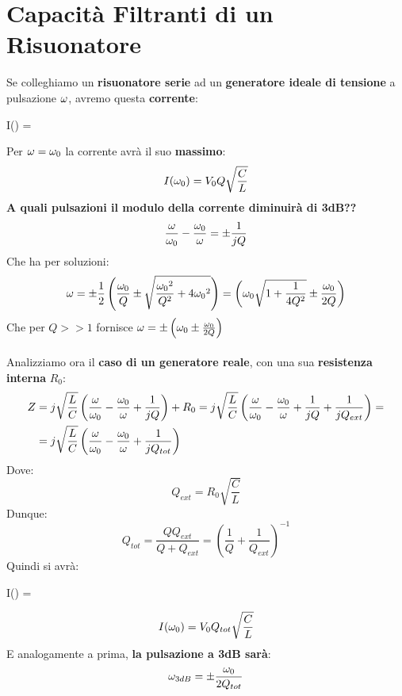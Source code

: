 \section{Capacità Filtranti di un Risuonatore}
Se colleghiamo un \textbf{risuonatore serie} ad un \textbf{generatore ideale di tensione} a pulsazione $\omega$, avremo questa \textbf{corrente}:
\begin{squared}[violet]
    I(\w) = 
\end{squared}
Per $\omega = \omega_0$ la corrente avrà il suo \textbf{massimo}:
\begin{equation*}
    I(\omega_0) = V_0 Q \sqrt{\frac{C}{L}}
\end{equation*}
\textbf{A quali pulsazioni il modulo della corrente diminuirà di 3dB??}
\begin{equation*}
    \frac{\omega}{\omega_0} - \frac{\omega_0}{\omega} = \pm \frac{1}{j Q}
\end{equation*}
Che ha per soluzioni:
\begin{equation*}
    \omega = \pm \frac{1}{2} \left(\frac{\omega_0}{Q} \pm \sqrt{\frac{{\omega_0}^2}{Q^2} + 4 {\omega_0}^2}\right) = \left(\omega_0 \sqrt{1 + \frac{1}{4Q^2} } \pm \frac{\omega_0}{2Q}\right)
\end{equation*}
Che per $Q >> 1$ fornisce $\omega = \pm \left(\omega_0 \pm \frac{\omega_0}{2Q}\right)$
\\ \\
Analizziamo ora il \textbf{caso di un generatore reale}, con una sua \textbf{resistenza interna} $R_0$:
\begin{equation*}
\begin{aligned}
    Z &= j \sqrt{\frac{L}{C}} \left(\frac{\omega}{\omega_0} - \frac{\omega_0}{\omega} + \frac{1}{j Q}\right) + R_0 = j \sqrt{\frac{L}{C}} \left(\frac{\omega}{\omega_0} - \frac{\omega_0}{\omega} + \frac{1}{j Q} + \frac{1}{j Q_{ext}}\right ) = \\
    &=j \sqrt{\frac{L}{C}} \left(\frac{\omega}{\omega_0} - \frac{\omega_0}{\omega}  + \frac{1}{j Q_{tot}}\right )
\end{aligned}
\end{equation*}
Dove:
\begin{equation*}
    Q_{ext} = R_0 \sqrt{\frac{C}{L}}
\end{equation*}
Dunque:
\begin{equation*}
    Q_{tot} = \frac{QQ_{ext}}{Q + Q_{ext}} = \left(\frac{1}{Q} + \frac{1}{Q_{ext}}\right)^{-1}
\end{equation*}
Quindi si avrà:
\begin{squared}[violet]
     I(\w) = 
\end{squared}
\begin{equation*}
    I(\omega_0) = V_0 Q_{tot} \sqrt{\frac{C}{L}}
\end{equation*}
E analogamente a prima, \textbf{la pulsazione a 3dB sarà}:
\begin{equation*}
    \omega_{3dB} = \pm \frac{\omega_0}{2Q_{tot}}
\end{equation*}

